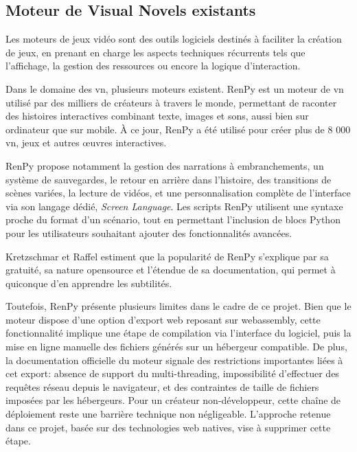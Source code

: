 \subsection{Moteur de Visual Novels existants}

Les moteurs de jeux vidéo sont des outils logiciels destinés à faciliter la création de jeux, en prenant en charge les aspects techniques récurrents tels que l'affichage, la gestion des ressources ou encore la logique d'interaction.

Dans le domaine des \gls{vn}, plusieurs moteurs existent. RenPy est un moteur de \gls{vn} utilisé par des milliers de créateurs à travers le monde, permettant de raconter des histoires interactives combinant texte, images et sons, aussi bien sur ordinateur que sur mobile. À ce jour, RenPy a été utilisé pour créer plus de 8 000 \gls{vn}, jeux et autres \oe{}uvres interactives. \parencite{noauthor_renpy_nodate}

RenPy propose notamment la gestion des narrations à embranchements, un système de sauvegardes, le retour en arrière dans l'histoire, des transitions de scènes variées, la lecture de vidéos, et une personnalisation complète de l'interface via son langage dédié, \textit{Screen Language}. Les scripts RenPy utilisent une \gls{syntaxe} proche du format d'un scénario, tout en permettant l'inclusion de blocs Python pour les utilisateurs souhaitant ajouter des fonctionnalités avancées. \parencite{noauthor_renpy_nodate}

Kretzschmar et Raffel estiment que la popularité de RenPy s'explique par sa gratuité, sa nature \gls{opensource} et l'étendue de sa documentation, qui permet à quiconque d'en apprendre les subtilités. \parencite{kretzschmar_history_2023}

Toutefois, RenPy présente plusieurs limites dans le cadre de ce projet. Bien que le moteur dispose d'une option d'export web reposant sur \gls{webassembly}, cette fonctionnalité implique une étape de compilation via l'interface du logiciel, puis la mise en ligne manuelle des fichiers générés sur un hébergeur compatible. De plus, la documentation officielle du moteur signale des restrictions importantes liées à cet export: absence de support du multi-threading, impossibilité d'effectuer des requêtes réseau depuis le navigateur, et des contraintes de taille de fichiers imposées par les hébergeurs. \parencite{noauthor_renpy_nodate} Pour un créateur non-développeur, cette chaîne de déploiement reste une barrière technique non négligeable. L'approche retenue dans ce projet, basée sur des technologies web natives, vise à supprimer cette étape.



